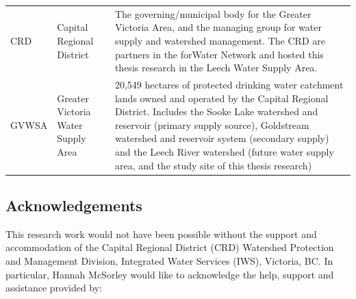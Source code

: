 \documentclass[]{article}
\begin{document}
\begin{longtable}[]{@{}lll@{}}
\begin{minipage}[t]{0.11\columnwidth}
CRD\strut
\end{minipage} & \begin{minipage}[t]{0.09\columnwidth}\raggedright\strut
Capital Regional District\strut
\end{minipage} & \begin{minipage}[t]{0.16\columnwidth}\raggedright\strut
The governing/municipal body for the Greater Victoria Area, and the
managing group for water supply and watershed management. The CRD are
partners in the forWater Network and hosted this thesis research in the
Leech Water Supply Area.\strut
\end{minipage}\tabularnewline
\begin{minipage}[t]{0.11\columnwidth}\raggedright\strut
GVWSA\strut
\end{minipage} & \begin{minipage}[t]{0.09\columnwidth}\raggedright\strut
Greater Victoria Water Supply Area\strut
\end{minipage} & \begin{minipage}[t]{0.16\columnwidth}\raggedright\strut
20,549 hectares of protected drinking water catchment lands owned and
operated by the Capital Regional District. Includes the Sooke Lake
watershed and reservoir (primary supply source), Goldstream watershed
and reservoir system (secondary supply) and the Leech River watershed
(future water supply area, and the study site of this thesis
research)\strut
\end{minipage}\tabularnewline
\bottomrule
\end{longtable}

\subsection{Acknowledgements}\label{acknowledgements}

This research work would not have been possible without the support and
accommodation of the Capital Regional District (CRD) Watershed
Protection and Management Division, Integrated Water Services (IWS),
Victoria, BC. In particular, Hannah McSorley would like to acknowledge
the help, support and assistance provided by:
\end{document}
